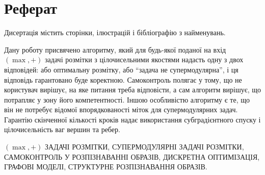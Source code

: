 \chapter*{Реферат}

Дисертація містить
\pageref{LastPage}
сторінки,
ілюстрацій
і бібліографію з
найменувань.

Дану роботу присвячено алгоритму, який для будь-якої
поданої на вхід \((\max,+)\) задачі розмітки з цілочисельними
якостями надасть одну з двох відповідей: або оптимальну
розмітку, або ``задача не супермодулярна'', і ця
відповідь гарантовано буде коректною.
Самоконтроль полягає у тому, що не користувач вирішує,
на яке питання треба відповісти, а сам алгоритм вирішує,
що потрапляє у зону його компетентності. Іншою
особливістю алгоритму є те, що він не потребує відомої
впорядкованості міток для супермодулярних задач.
Гарантію скінченної кількості кроків надає використання
субградієнтного спуску і цілочисельність ваг вершин та ребер.

\MakeUppercase{\((\max,+)\) задачі розмітки,
супермодулярні задачі розмітки,
самоконтроль у розпізнаванні образів,
дискретна оптимізація, графові моделі,
структурне розпізнавання образів.}
